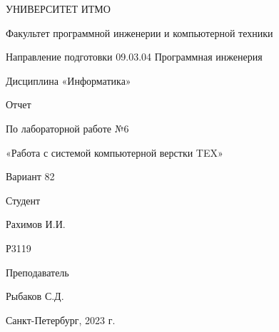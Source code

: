 \begin{titlepage}
\sffamily
    {\centering
        \vspace*{5em}
        \Large УНИВЕРСИТЕТ ИТМО \par\bigbreak
        \vspace*{3em}
        \large Факультет программной инженерии и компьютерной техники
        \par\bigbreak
        Направление подготовки 09.03.04 Программная инженерия\par\bigbreak
        Дисциплина «Информатика» \par\bigbreak
        \vspace*{2em}
        \Large Отчет \par\bigbreak
        \large По лабораторной работе №6 \par\bigbreak
        «Работа с системой компьютерной верстки TEX» \par\bigbreak
        Вариант 82 \par\bigbreak
    }
    \vspace*{10em}
    \begin{flushright}
    \begin{minipage}{.20\textwidth}
        {\normalsize
        Студент\par\bigbreak
        Рахимов И.И.\par\bigbreak
        Р3119\par\bigbreak
        \vspace*{3em}
        Преподаватель\par\bigbreak
        Рыбаков С.Д.\par\bigbreak
        }
    \end{minipage}
    \end{flushright}
    {\centering
        \vspace*{12em}
        Санкт-Петербург, 2023 г. \par
    }
\end{titlepage}